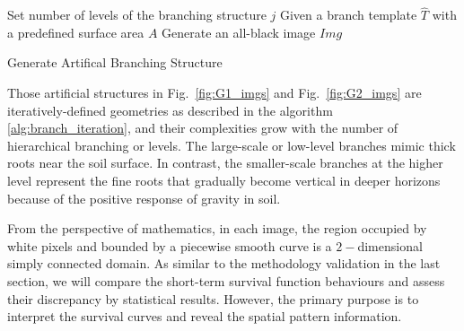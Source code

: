   \begin{algorithm}
    \SetAlgoLined

      Set number of levels of the branching structure $j$\;
      Given a branch template $\widehat{T}$ with a predefined surface area $A$\;
      Generate an all-black image $Img$\;
      
      
    
      \caption{Generate Artifical Branching Structure}
      \label{alg:branch_iteration}
  \end{algorithm}


Those artificial structures in Fig.~\ref{fig:G1_imgs} and
Fig.~\ref{fig:G2_imgs} are iteratively-defined geometries as described
in the algorithm \ref{alg:branch_iteration}, and their complexities grow
with the number of hierarchical branching or levels. The large-scale
or low-level branches mimic thick roots near the soil surface. In
contrast, the smaller-scale branches at the higher level represent the
fine roots that gradually become vertical in deeper horizons because
of the positive response of gravity in soil. 


From the perspective of mathematics, in each image, the region
occupied by white pixels and bounded by a piecewise smooth curve is a
$2-$dimensional simply connected domain. As similar to the methodology
validation in the last section, we will compare the short-term
survival function behaviours and assess their discrepancy by
statistical results. However, the primary purpose is to interpret the
survival curves and reveal the spatial pattern information.









      

      
    






